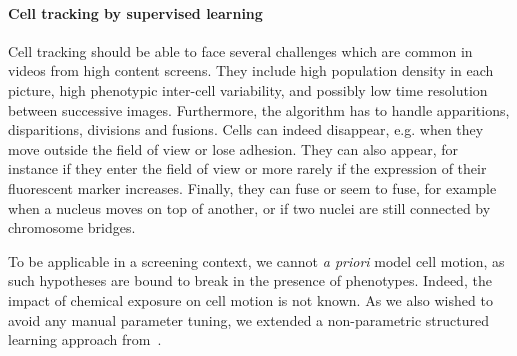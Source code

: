 \paragraph*{Cell tracking by supervised learning}
Cell tracking should be able to face several challenges which are
common in videos from high content screens. They
include high population density in each picture, high phenotypic
inter-cell variability, and possibly low time resolution between
successive images. Furthermore, the algorithm has to handle
apparitions, disparitions, divisions and fusions. Cells can indeed disappear, e.g. when they move outside the field of view or lose adhesion. They can also appear, for instance if they enter the field of view or more rarely if the expression of their fluorescent marker increases. Finally, they can fuse or seem to fuse, for example when a nucleus moves on top of another, or if two nuclei are still connected by chromosome bridges. %

To be applicable in a screening context, we cannot \textit{a priori}
model cell motion, as such hypotheses are bound to break in the
presence of phenotypes. Indeed, the impact of chemical exposure on
cell motion is not known. As we also wished to avoid any manual parameter tuning, we extended a non-parametric structured learning approach from~\cite{lou}. %

